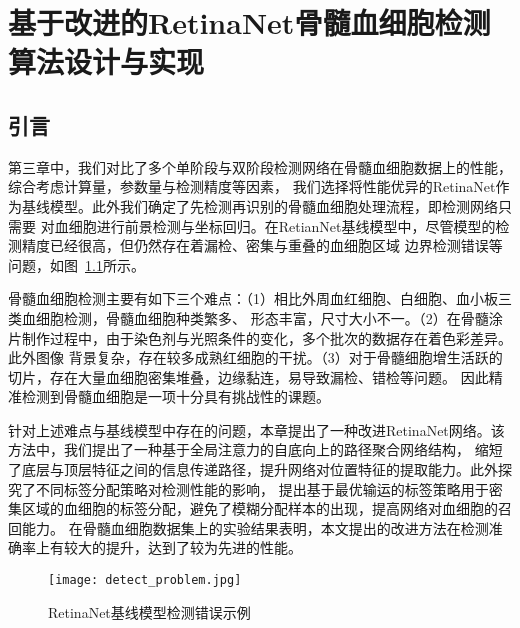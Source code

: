 \chapter{基于改进的RetinaNet骨髓血细胞检测算法设计与实现}
\section{引言}

第三章中，我们对比了多个单阶段与双阶段检测网络在骨髓血细胞数据上的性能，综合考虑计算量，参数量与检测精度等因素，
我们选择将性能优异的RetinaNet作为基线模型。此外我们确定了先检测再识别的骨髓血细胞处理流程，即检测网络只需要
对血细胞进行前景检测与坐标回归。在RetianNet基线模型中，尽管模型的检测精度已经很高，但仍然存在着漏检、密集与重叠的血细胞区域
边界检测错误等问题，如图~\ref{fig:detect_problem}所示。

骨髓血细胞检测主要有如下三个难点：（1）相比外周血红细胞、白细胞、血小板三类血细胞检测，骨髓血细胞种类繁多、
形态丰富，尺寸大小不一。（2）在骨髓涂片制作过程中，由于染色剂与光照条件的变化，多个批次的数据存在着色彩差异。此外图像
背景复杂，存在较多成熟红细胞的干扰。（3）对于骨髓细胞增生活跃的切片，存在大量血细胞密集堆叠，边缘黏连，易导致漏检、错检等问题。
因此精准检测到骨髓血细胞是一项十分具有挑战性的课题。

针对上述难点与基线模型中存在的问题，本章提出了一种改进RetinaNet网络。该方法中，我们提出了一种基于全局注意力的自底向上的路径聚合网络结构，
缩短了底层与顶层特征之间的信息传递路径，提升网络对位置特征的提取能力。此外探究了不同标签分配策略对检测性能的影响，
提出基于最优输运的标签策略用于密集区域的血细胞的标签分配，避免了模糊分配样本的出现，提高网络对血细胞的召回能力。
在骨髓血细胞数据集上的实验结果表明，本文提出的改进方法在检测准确率上有较大的提升，达到了较为先进的性能。

\begin{figure}[htbp]                     
  \centering                      
  \texttt{[image: detect\_problem.jpg]}                      
  \caption{RetinaNet基线模型检测错误示例}                      
  \label{fig:detect_problem}       
\end{figure}  

